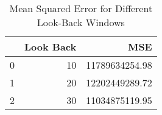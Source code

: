 \begin{table}
    \caption{Mean Squared Error for Different Look-Back Windows}
    \label{tab:mse_results}
    \begin{tabular}{lrr}
        \toprule
        & Look Back & MSE \\
        \midrule
        0 & 10 & 11789634254.98 \\
        1 & 20 & 12202449289.72 \\
        2 & 30 & 11034875119.95 \\
        \bottomrule
    \end{tabular}
\end{table}
